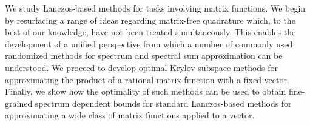 \vfill
{\fontsize{11}{24}\selectfont
We study Lanczos-based methods for tasks involving matrix functions.
We begin by resurfacing a range of ideas regarding matrix-free quadrature which, to the best of our knowledge, have not been treated simultaneously. 
This enables the development of a unified perspective from which a number of commonly used randomized methods for spectrum and spectral sum approximation can be understood.
We proceed to develop optimal Krylov subspace methods for approximating the product of a rational matrix function with a fixed vector.
Finally, we show how the optimality of such methods can be used to obtain fine-grained spectrum dependent bounds for standard Lanczos-based methods for approximating a wide class of matrix functions applied to a vector.
}
\thispagestyle{empty}
